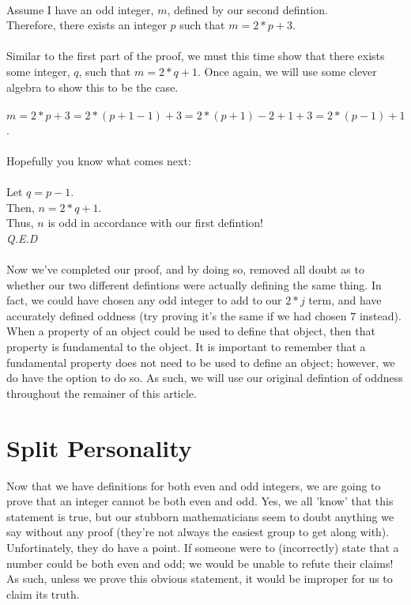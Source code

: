 \documentclass[a4paper,12pt]{article}
\begin{document}
\\
Assume I have an odd integer, $m$, defined by our second defintion.\\
Therefore, there exists an integer $p$ such that $m = 2*p + 3$.\\
\\
Similar to the first part of the proof, we must this time show that there exists some integer, $q$, such that $m = 2*q + 1$. Once again, we will use some clever algebra to show this to be the case.\\
\\
$m = 2*p + 3 = 2*(p + 1 - 1) + 3 = 2*(p + 1) - 2+1 + 3 = 2*(p - 1) + 1$.\\
\\
Hopefully you know what comes next:\\
\\
Let $q = p - 1$.\\
Then, $n = 2*q + 1$.\\
Thus, $n$ is odd in accordance with our first defintion!\\
\textit{Q.E.D}\\
\\
Now we've completed our proof, and by doing so, removed all doubt as to whether our two different defintions were actually defining the same thing. In fact, we could have chosen any odd integer to add to our $2*j$ term, and have accurately defined oddness (try proving it's the same if we had chosen $7$ instead). When a property of an object could be used to define that object, then that property is fundamental to the object. It is important to remember that a fundamental property does not need to be used to define an object; however, we do have the option to do so. As such, we will use our original defintion of oddness throughout the remainer of this article.   

\section{Split Personality}
Now that we have definitions for both even and odd integers, we are going to prove that an integer cannot be both even and odd. Yes, we all 'know' that this statement is true, but our stubborn mathematicians seem to doubt anything we say without any proof (they're not always the easiest group to get along with). Unfortinately, they do have a point. If someone were to (incorrectly) state that a number could be both even and odd; we would be unable to refute their claims! As such, unless we prove this obvious statement, it would be improper for us to claim its truth.
\end{document}
